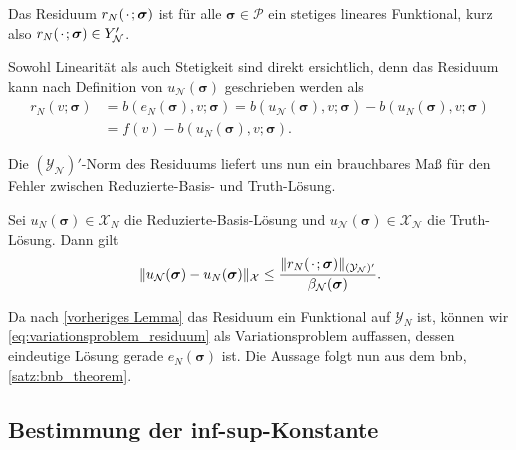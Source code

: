 \documentclass[../main.tex]{subfiles}
\begin{document}
\begin{Lemma}
    Das Residuum $r_{N}({\mkern2mu\cdot\mkern2mu}; \bm \sigma)$ ist für alle $\bm \sigma \in \mathcal P$ ein stetiges lineares Funktional, kurz also $r_{N}({\mkern2mu\cdot\mkern2mu}; \bm \sigma) \in \mathcal \mathcal Y_{\mathcal N}'$.

    \begin{Beweis}
        Sowohl Linearität als auch Stetigkeit sind direkt ersichtlich, denn das Residuum kann nach Definition von $u_{\mathcal N}(\bm \sigma)$ geschrieben werden als
        \begin{equation}
            \begin{aligned}
            r_{N}(v; \bm \sigma)
            &= b(e_{N}(\bm \sigma), v; \bm \sigma)
            = b(u_{\mathcal N}(\bm \sigma), v; \bm \sigma) - b(u_{N}(\bm \sigma), v; \bm \sigma)
            \\&= f(v) - b(u_{N}(\bm \sigma), v; \bm \sigma).
            \end{aligned}
        \end{equation}
    \end{Beweis}
\end{Lemma}

Die $(\mathcal Y_{\mathcal N})'$-Norm des Residuums liefert uns nun ein brauchbares Maß für den Fehler zwischen Reduzierte-Basis- und Truth-Lösung.

\begin{Lemma}
    Sei $u_{N}(\bm \sigma) \in \mathcal X_{N}$ die Reduzierte-Basis-Lösung und $u_{\mathcal N}(\bm \sigma) \in \mathcal X_{\mathcal N}$ die Truth-Lösung.
    Dann gilt
    \begin{equation}
        \lVert u_{\mathcal N}(\bm \sigma) - u_{N}(\bm \sigma)\rVert_{\mathcal X} \leq \frac{\lVert r_{N}({\mkern2mu\cdot\mkern2mu}; \bm \sigma)\rVert_{(\mathcal Y_{\mathcal N})'}}{\beta_{\mathcal N}(\bm \sigma)}.
    \end{equation}

    \begin{Beweis}
        Da nach \cref{vorheriges Lemma} das Residuum ein Funktional auf $\mathcal Y_{N}$ ist, können wir \cref{eq:variationsproblem_residuum} als Variationsproblem auffassen, dessen eindeutige Lösung gerade $e_{N}(\bm \sigma)$ ist.
        Die Aussage folgt nun aus dem \acl{bnb}, \cref{satz:bnb_theorem}.
    \end{Beweis}
\end{Lemma}


\subsection{Bestimmung der inf-sup-Konstante} %
\label{sub:bestimmung_der_inf_sup_konstante}
\end{document}
